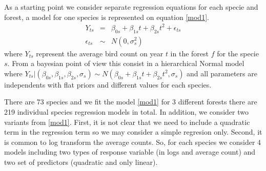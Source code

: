 \documentclass{article}
\begin{document}
As a starting point we consider separate regression equations for each specie and forest, a model for one species is represented on equation \ref{mod1}. 
\begin{eqnarray}
\nonumber Y_{ts} &=&  \beta_{0s} + \beta_{1s}t + \beta_{2s}t^2 + \epsilon_{ts}  \\
\epsilon_{ts} &\sim& N(0,\sigma_{s}^2)
\label{mod1}
\end{eqnarray}
where $Y_{ts}$ represent the average bird count on year $t$ in the forest $f$ for the specie $s$. From a bayesian point of view this consist in a hierarchical Normal model where $Y_{ts}\vert (\beta_{0s},\beta_{1s},\beta_{2s},\sigma_{s}) \sim N(\beta_{0s}+\beta_{1s}t+\beta_{2s}t^2, \sigma_{s})$ and all parameters are independents with flat priors and different values for each species. 

There are 73 species and we fit the model \ref{mod1} for 3 different forests there are 219 individual species regression models in total. In addition, we consider two variants from \ref{mod1}. First, it is not clear that we need to include a quadratic term in the regression term so we may consider a simple regresion only. Second, it is common to log transform the average counts. So, for each species we consider 4 models including two types of response variable (in logs and average count) and two set of predictors (quadratic and only linear). 
 
\end{document}
